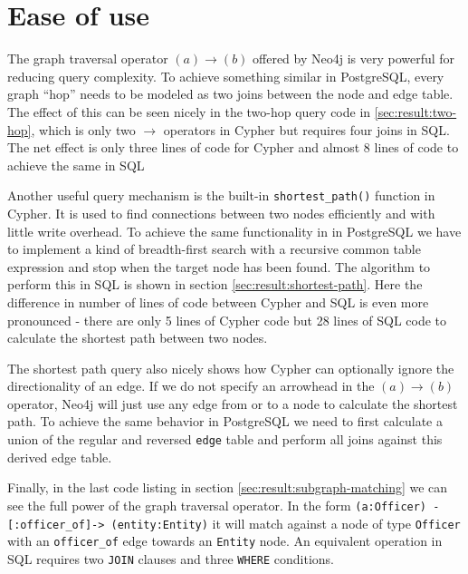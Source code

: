 \documentclass[11pt, a4paper,oneside,chapterprefix=false]{scrbook}
\begin{document}
\section{Ease of use} \label{sec:convenience}

The graph traversal operator $(a) \rightarrow (b)$ offered by Neo4j is very powerful for reducing query complexity.
To achieve something similar in PostgreSQL, every graph ``hop'' needs to be modeled as two joins between the node and edge table. The effect of this can be seen nicely in the two-hop query code in \ref{sec:result:two-hop}, which is only two $\rightarrow$ operators in Cypher but requires four joins in SQL. The net effect is only three lines of code for Cypher and almost 8 lines of code to achieve the same in SQL

Another useful query mechanism is the built-in \lstinline{shortest_path()} function in Cypher.
It is used to find connections between two nodes efficiently and with little write overhead.
To achieve the same functionality in in PostgreSQL we have to implement a kind of breadth-first search with a recursive common table expression and stop when the target node has been found.
The algorithm to perform this in SQL is shown in section \ref{sec:result:shortest-path}.
Here the difference in number of lines of code between Cypher and SQL is even more pronounced - there are only 5 lines of Cypher code but 28 lines of SQL code to calculate the shortest path between two nodes.

The shortest path query also nicely shows how Cypher can optionally ignore the directionality of an edge.
If we do not specify an arrowhead in the $(a) \rightarrow (b)$ operator, Neo4j will just use any edge from or to a node to calculate the shortest path.
To achieve the same behavior in PostgreSQL we need to first calculate a union of the regular and reversed \lstinline{edge} table and perform all joins against this derived edge table.

Finally, in the last code listing in section \ref{sec:result:subgraph-matching} we can see the full power of the graph traversal operator. In the form \lstinline{(a:Officer) -[:officer_of]-> (entity:Entity)} it will match against a node of type \lstinline{Officer} with an \lstinline{officer_of} edge towards an \lstinline{Entity} node. An equivalent operation in SQL requires two \lstinline{JOIN} clauses and three \lstinline{WHERE} conditions.
\end{document}
